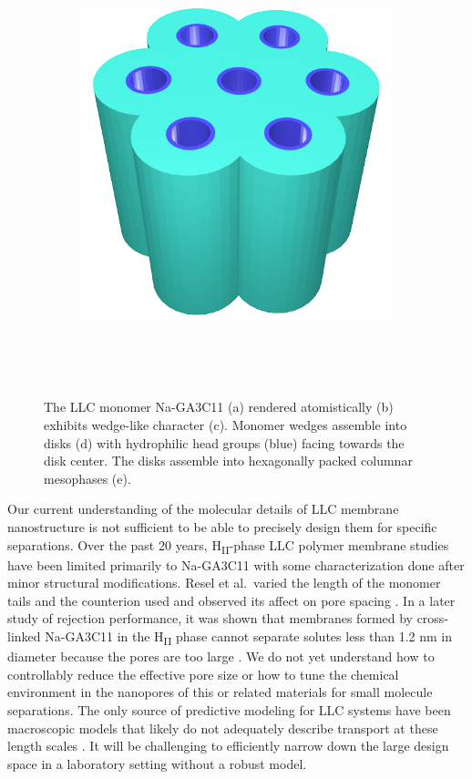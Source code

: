 \documentclass[journal=jpcbfk,manusciprt=article]{achemso}
\begin{document}
\begin{figure}
\begin{subfigure}{0.4\linewidth}
		\caption{}~\label{fig:wedge_layer}
	\end{subfigure}
	\begin{subfigure}{0.4\linewidth}
		\centering
		\includegraphics[width=\textwidth]{hexagonal_packing.png}
		\caption{}~\label{fig:hex_packing_simple}
	\end{subfigure}
	\caption{The LLC monomer Na-GA3C11 (a) rendered atomistically (b)
	exhibits wedge-like character (c). Monomer wedges assemble into disks (d) with
	hydrophilic head groups (blue) facing towards the disk center. The disks
	assemble into hexagonally packed columnar mesophases (e).}~\label{fig:assembly}
  \end{figure}

  Our current understanding of the molecular details of LLC membrane nanostructure
  is not sufficient to be able to precisely design them for specific separations. 
  Over the past 20 years, H\textsubscript{II}-phase LLC polymer membrane studies have
  been limited primarily to Na-GA3C11 with some characterization done after minor 
  structural modifications. Resel et al.~varied the length of the monomer tails and the
  counterion used and observed its affect on pore spacing \cite{resel_structural_2000}.
  In a later study of rejection performance, it was shown that membranes formed by cross-
  linked Na-GA3C11 in the H\textsubscript{II} phase cannot separate solutes less than 1.2 
  nm in diameter because the pores are too large \cite{zhou_supported_2005}. We do not
  yet understand how to controllably reduce the effective pore size or how to tune
  the chemical environment in the nanopores of this or related materials for
  small molecule separations. The only source of predictive modeling for LLC
  systems have been macroscopic models that likely do not adequately describe
  transport at these length scales \cite{hatakeyama_water_2011}. It will be
  challenging to efficiently narrow down the large design space in a laboratory
  setting without a robust model.
\end{document}
